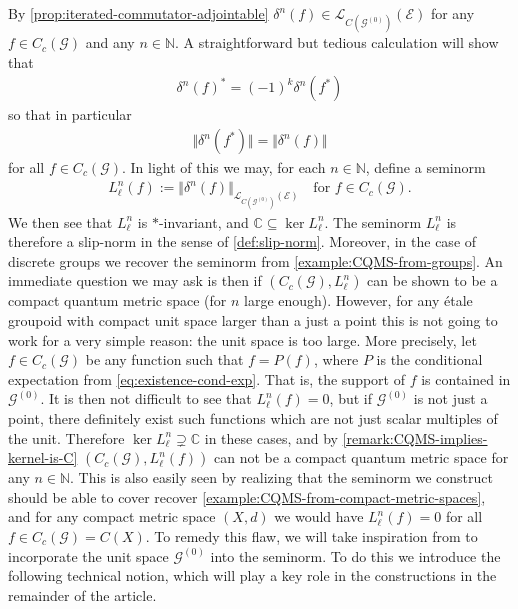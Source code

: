 \documentclass[11pt,a4paper,oneside,final,reqno]{amsart}
\theoremstyle{definition}
\newcommand{\G}{\mathcal{G}}
\newcommand{\Go}{\mathcal{G}^{(0)}}
\newcommand{\E}{\mathcal{E}}
\newcommand{\curlyL}{\mathcal{L}}
\newcommand{\C}{\mathbb{C}}
\newcommand{\N}{\mathbb{N}}
\numberwithin{equation}{section}
\begin{document}
	By \cref{prop:iterated-commutator-adjointable} $\delta^n (f) \in \mathcal{L}_{C(\Go)}(\E)$ for any $f \in C_c(\G)$ and any $n \in \N$. A straightforward but tedious calculation will show that
	\begin{align*}
		\delta^n (f)^* = (-1)^k \delta^n(f^*)
	\end{align*}
	so that in particular
	\begin{align*}
		\Vert \delta^n (f^*) \Vert = \Vert \delta^n(f) \Vert 
	\end{align*}
	for all $f \in C_c(\G)$. 
	In light of 
	this
	we may, for each $n \in \N$, define a seminorm 
	\begin{align}\label{eq:definition-commutator-seminorm}
		L_\ell^{n}(f) := \Vert \delta^n (f)\Vert_{\curlyL_{C(\Go)}(\E)} \quad \text{for }f \in C_c(\G).
	\end{align}
	We then see that $L_\ell^n$ is $*$-invariant, and 
 $\C  \subseteq \ker L_\ell^n$. 
	The seminorm $L_\ell^n$ is therefore a slip-norm in the sense of \cref{def:slip-norm}. 
	Moreover,
	in the case of discrete groups we recover the seminorm from \cref{example:CQMS-from-groups}. An immediate question we may ask
	is then if $(C_c (\G), L_\ell^n)$ can be shown to be a compact quantum metric space (for $n$ large enough). However, for any \'etale groupoid with compact unit space larger than a just a point this is not going to work for a very simple reason: the unit space is too large. More precisely, let $f \in C_c (\G)$ be any function such that $f = P(f)$, where $P$ is the conditional expectation from \eqref{eq:existence-cond-exp}. That is, the  support of $f$ is contained in $\Go$. It is then not difficult to see that $L_\ell^n (f) = 0$, but if $\Go$ is not just a point, there definitely exist such functions which are not just scalar multiples of the unit. Therefore $\ker L_\ell^n \supsetneq \C$ in these cases, and by \cref{remark:CQMS-implies-kernel-is-C} $(C_c (\G), L_\ell^n (f))$ can not be a compact quantum metric space for any $n \in \N$. This is also easily seen by realizing that the seminorm we construct should be able to cover recover \cref{example:CQMS-from-compact-metric-spaces}, and for any compact metric space $(X,d)$ we would have $L_\ell^n (f) = 0$ for all $f \in C_c (\G) = C(X)$. To remedy this flaw, we will take inspiration from \cite{AustadKaadKyed2025} to incorporate the unit space $\Go$ into the seminorm. To do this we introduce the following technical notion, which will play a key role in the constructions in the remainder of the article.
	
\end{document}
